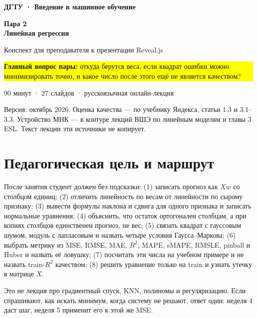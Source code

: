 \documentclass[11pt,a4paper]{article}
\begin{document}
\begin{titlepage}
\vspace*{25mm}
{\color{blue}\bfseries\Large ДГТУ · Введение в машинное обучение\par}
\vspace{10mm}
{\color{navy}\bfseries\fontsize{30}{35}\selectfont Пара 2\\[3mm] Линейная регрессия\par}
\vspace{8mm}
{\Large Конспект для преподавателя к презентации Reveal.js\par}
\vspace{18mm}
\colorbox{yellow}{\parbox{0.86\textwidth}{\vspace{4mm}\large\textbf{Главный вопрос пары:} откуда берутся веса, если квадрат ошибки можно минимизировать точно, и какое число после этого ещё не является качеством?\vspace{4mm}}}
\vfill
{\large 90 минут · 27 слайдов · русскоязычная онлайн-лекция\par}
\vspace{5mm}
{\small Версия: октябрь 2026. Оценка качества --- по учебнику Яндекса, статьи 1.3 и 3.1--3.3. Устройство МНК --- в контуре лекций ВШЭ по линейным моделям и главы 3 ESL. Текст лекции эти источники не копирует.\par}
\end{titlepage}

\tableofcontents
\newpage

\section{Педагогическая цель и маршрут}

После занятия студент должен без подсказки: (1) записать прогноз как \(Xw\) со столбцом единиц; (2) отличить линейность по весам от линейности по сырому признаку; (3) вывести формулы наклона и сдвига для одного признака и записать нормальные уравнения; (4) объяснить, что остаток ортогонален столбцам, а при копиях столбцов единственен прогноз, не вес; (5) связать квадрат с гауссовым шумом, модуль с лапласовым и назвать четыре условия Гаусса--Маркова; (6) выбрать метрику из MSE, RMSE, MAE, \(R^{2}\), MAPE, sMAPE, RMSLE, pinball и Huber и назвать её ловушку; (7) посчитать эти числа на учебном примере и не назвать train-\(R^{2}\) качеством; (8) решить уравнение только на train и узнать утечку в матрице \(X\).

Это не лекция про градиентный спуск, KNN, полиномы и регуляризацию. Если спрашивают, как искать минимум, когда систему не решают, ответ один: неделя 4 даст шаг, неделя 5 применит его к этой же MSE.
\end{document}
